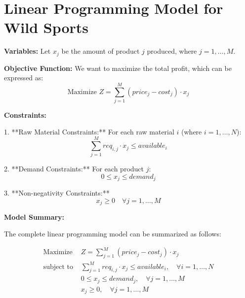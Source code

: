 \documentclass{article}
\begin{document}
\section*{Linear Programming Model for Wild Sports}

\textbf{Variables:}
Let \( x_j \) be the amount of product \( j \) produced, where \( j = 1, \ldots, M \).

\textbf{Objective Function:}
We want to maximize the total profit, which can be expressed as:
\[
\text{Maximize } Z = \sum_{j=1}^{M} (price_j - cost_j) \cdot x_j
\]

\textbf{Constraints:}

1. **Raw Material Constraints:**
For each raw material \( i \) (where \( i = 1, \ldots, N \)):
\[
\sum_{j=1}^{M} req_{i,j} \cdot x_j \leq available_i
\]
   
2. **Demand Constraints:**
For each product \( j \):
\[
0 \leq x_j \leq demand_j
\]

3. **Non-negativity Constraints:**
\[
x_j \geq 0 \quad \forall j = 1, \ldots, M
\]

\textbf{Model Summary:}

The complete linear programming model can be summarized as follows:

\[
\begin{aligned}
\text{Maximize } & Z = \sum_{j=1}^{M} (price_j - cost_j) \cdot x_j \\
\text{subject to } & \sum_{j=1}^{M} req_{i,j} \cdot x_j \leq available_i, \quad \forall i = 1, \ldots, N \\
& 0 \leq x_j \leq demand_j, \quad \forall j = 1, \ldots, M \\
& x_j \geq 0, \quad \forall j = 1, \ldots, M
\end{aligned}
\]
\end{document}
